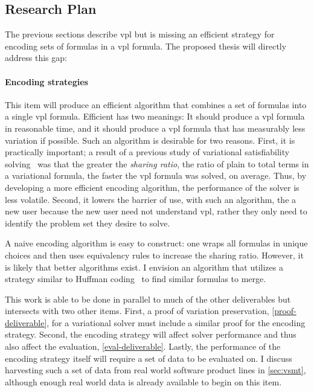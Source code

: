 \subsection{Research Plan}

The previous sections describe \ac{vpl} but is missing an efficient strategy for
encoding sets of \pl{} formulas in a \ac{vpl} formula. The proposed thesis will
directly address this gap:

\paragraph{Encoding strategies} This item will produce an efficient algorithm
that combines a set of \pl{} formulas into a single \ac{vpl} formula. Efficient
has two meanings: It should produce a \ac{vpl} formula in reasonable time, and
it should produce a \ac{vpl} formula that has measurably less variation if
possible. Such an algorithm is desirable for two reasons. First, it is
practically important; a result of a previous study of variational
satisfiability solving~\cite{10.1145/3382025.3414965} was that the greater the
\emph{sharing ratio}, the ratio of plain to total terms in a variational
formula, the faster the \ac{vpl} formula was solved, on average. Thus, by
developing a more efficient encoding algorithm, the performance of the solver is
less volatile. Second, it lowers the barrier of use, with such an algorithm, the
a new user because the new user need not understand \ac{vpl}, rather they only
need to identify the problem set they desire to solve.

A naive encoding algorithm is easy to construct: one wraps all formulas in
unique choices and then uses equivalency rules to increase the sharing ratio.
However, it is likely that better algorithms exist. I envision an algorithm that
utilizes a strategy similar to Huffman coding~\cite{4051119} to find similar
formulas to merge.

This work is able to be done in parallel to much of the other deliverables but
intersects with two other items. First, a proof of variation preservation,
\autoref{proof-deliverable}, for a variational solver must include a similar
proof for the encoding strategy. Second, the encoding strategy will affect
solver performance and thus also affect the evaluation,
\autoref{eval-deliverable}. Lastly, the performance of the encoding strategy
itself will require a set of data to be evaluated on. I discuss harvesting such
a set of data from real world software product lines in \autoref{sec:vsmt},
although enough real world data is already available to begin on this item.

